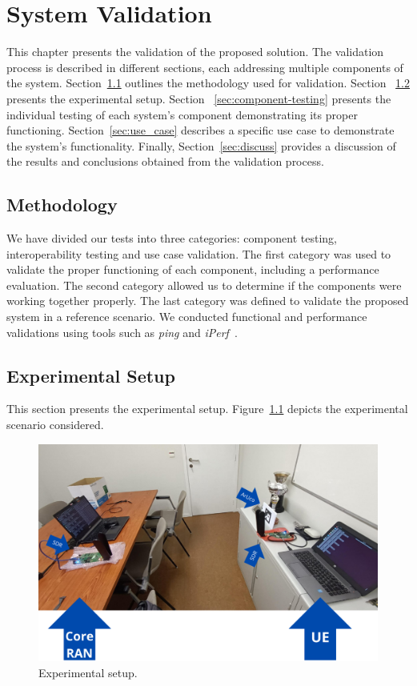 \chapter{System Validation}\label{ch:validation}

This chapter presents the validation of the proposed solution.
The validation process is described in different sections, each addressing multiple components of the system.
Section~\ref{sec:meth} outlines the methodology used for validation.
Section ~\ref{sec:experimental-setup} presents the experimental setup.
Section ~\ref{sec:component-testing} presents the individual testing of each system's component demonstrating its proper functioning.
Section~\ref{sec:use_case} describes a specific use case to demonstrate the system's functionality.
Finally, Section~\ref{sec:discuss} provides a discussion of the results and conclusions obtained from the validation process.

\section{Methodology}\label{sec:meth}
We have divided our tests into three categories: component testing, interoperability testing and use case validation.
The first category was used to validate the proper functioning of each component, including a performance evaluation.
The second category allowed us to determine if the components were working together properly.
The last category was defined to validate the proposed system in a reference scenario.
We conducted functional and performance validations using tools such as \emph{ping} and \emph{iPerf}~\cite{iperf}.

\section{Experimental Setup}\label{sec:experimental-setup}
This section presents the experimental setup.
Figure~\ref{fig:setup} depicts the experimental scenario considered.

\begin{figure}[H]
    \centering
    \includegraphics[width=\linewidth]{figures/setup}
    \caption{Experimental setup.}
    \label{fig:setup}
\end{figure}

